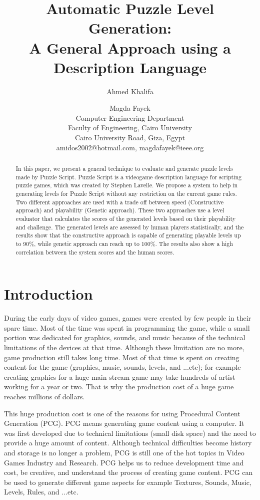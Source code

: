 \documentclass[letterpaper]{article}
\title{Automatic Puzzle Level Generation:\\
A General Approach using a Description Language}
\author{Ahmed Khalifa \and Magda Fayek\\
Computer Engineering Department\\
Faculty of Engineering, Cairo University\\
Cairo University Road, Giza, Egypt\\
amidos2002@hotmail.com, magdafayek@ieee.org\\
}
\begin{document}
 
\maketitle
\begin{abstract}
In this paper, we present a general technique to evaluate and generate puzzle levels made by Puzzle Script. Puzzle Script is a videogame description language for scripting puzzle games, which was created by Stephen Lavelle. We propose a system to help in generating levels for Puzzle Script without any restriction on the current game rules. Two different approaches are used with a trade off between speed (Constructive approach) and playability (Genetic approach). These two approaches use a level evaluator that calculates the scores of the generated levels based on their playability and challenge. The generated levels are assessed by human players statistically, and the results show that the constructive approach is capable of generating playable levels up to 90\%, while genetic approach can reach up to 100\%. The results also show a high correlation between the system scores and the human scores.
\end{abstract}

\section{Introduction}
During the early days of video games, games were created by few people in their spare time. Most of the time was spent in programming the game, while a small portion was dedicated for graphics, sounds, and music because of the technical limitations of the devices at that time. Although these limitation are no more, game production still takes long time. Most of that time is spent on creating content for the game (graphics, music, sounds, levels, and ...etc)\cite{budgetAAA}; for example creating graphics for a huge main stream game may take hundreds of artist working for a year or two. That is why the production cost of a huge game reaches millions of dollars\cite{gameCost}.\\\par

This huge production cost is one of the reasons for using Procedural Content Generation (PCG). PCG means generating game content using a computer. It was first developed due to technical limitations (small disk space) and the need to provide a huge amount of content\cite{pcgFirstGame}. Although technical difficulties become history and storage is no longer a problem, PCG is still one of the hot topics in Video Games Industry and Research. PCG helps us to reduce development time and cost, be creative, and understand the process of creating game content. PCG can be used to generate different game aspects for example Textures, Sounds, Music, Levels, Rules, and ...etc.\\\par
\end{document}
